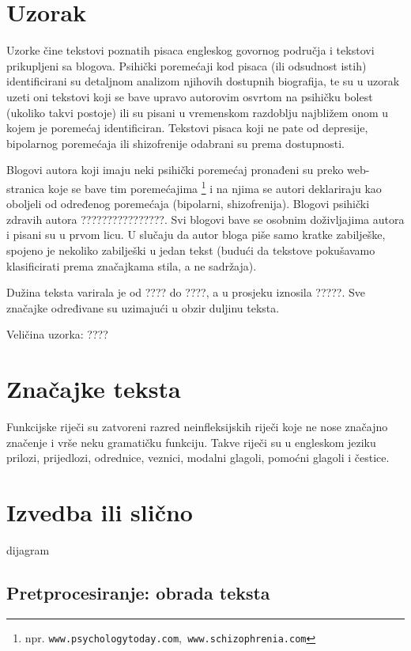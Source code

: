\documentclass[10pt, a4paper]{article}
\begin{document}
\section{Uzorak}
Uzorke čine tekstovi poznatih pisaca engleskog govornog područja i tekstovi prikupljeni sa blogova. Psihički poremećaji kod pisaca (ili odsudnost istih) identificirani su detaljnom analizom njihovih dostupnih biografija, te su u uzorak uzeti oni tekstovi koji se bave upravo autorovim osvrtom na psihičku bolest (ukoliko takvi postoje) ili su pisani u vremenskom razdoblju najbližem onom u kojem je poremećaj identificiran. Tekstovi pisaca koji ne pate od depresije, bipolarnog poremećaja ili shizofrenije odabrani su prema dostupnosti.

Blogovi autora koji imaju neki psihički poremećaj pronađeni su preko web-stranica koje se bave tim poremećajima \footnote{npr. \texttt{www.psychologytoday.com},\texttt{ www.schizophrenia.com}} i na njima se autori deklariraju kao oboljeli od određenog poremećaja (bipolarni, shizofrenija). Blogovi psihički zdravih autora ????????????????. Svi blogovi bave se osobnim doživljajima autora i pisani su u prvom licu. U slučaju da autor bloga piše samo kratke zabilješke, spojeno je nekoliko zabilješki u jedan tekst (budući da tekstove pokušavamo klasificirati prema značajkama stila, a ne sadržaja).
 
Dužina teksta varirala je od ???? do ????, a u prosjeku iznosila ?????. Sve značajke određivane su uzimajući u obzir duljinu teksta. 

Veličina uzorka: ????




\section{Značajke teksta}
Funkcijske riječi  su zatvoreni razred neinfleksijskih riječi koje ne nose značajno značenje i vrše neku gramatičku funkciju. Takve riječi su u engleskom jeziku prilozi, prijedlozi, odrednice, veznici, modalni glagoli, pomoćni glagoli i čestice.


\section{Izvedba ili slično}
dijagram

\subsection{Pretprocesiranje: obrada teksta}
\end{document}
